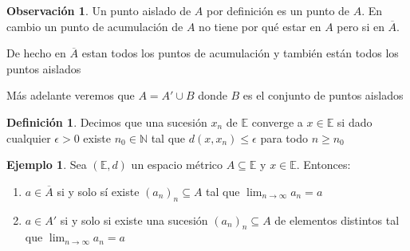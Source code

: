 \documentclass[12pt]{article}
\newcommand{\E}{\mathbb{E}}
\newcommand{\N}{\mathbb{N}}
\newcommand{\ra}{\rightarrow}
\newcommand{\ol}{\overline}
\theoremstyle{definition}
\newtheorem{definition}{Definición}[section]
\newtheorem*{remark}{Observación}
\newtheorem{ex}{Ejemplo}
\begin{document}
\begin{remark}
  Un punto aislado de $A$ por definición es un punto de $A$. En cambio un punto de acumulación de $A$ no tiene por qué estar en $A$ pero si en $\ol A$. 

  De hecho en $\ol A$ estan todos los puntos de acumulación y también están todos los puntos aislados

Más adelante veremos que $A = A' \cup B$ donde $B$ es el conjunto de puntos aislados
\end{remark}


\begin{definition}
  Decimos que una sucesión $x_{n}$ de $\E$ converge a $x \in \E$ si dado cualquier $\epsilon > 0$ existe $n_{0} \in \N$ tal que $d(x,x_{n}) \leq \epsilon$ para todo $n \geq n_{0}$  
 
\end{definition}

\begin{ex}
  Sea $(\E,d)$ un espacio métrico $A \subseteq \E$ y $x \in \E$. Entonces:

  \begin{enumerate}
    \item $a \in \ol A$ si y solo sí existe $(a_{n})_{n} \subseteq A$ tal que $\lim_{n \ra \infty} a_{n} = a$
    \item $a \in A'$ si y solo si existe una sucesión $(a_{n})_{n} \subseteq A$ de elementos distintos tal que $\lim_{n \ra \infty} a_{n} = a$
  \end{enumerate}
\end{ex}
\end{document}
